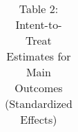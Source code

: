 \begin{longtable}{llcccccccccc}
\caption{Table 2: Intent-to-Treat Estimates for Main Outcomes (Standardized Effects)} \label{tab:all__std1} \\                                                                                                                                                                                                                                                                                                                                                                                                                                                                                                                                                                                                                                                                                                                                                                          
\hline \hline                                                                                                                                                                                                                                                                                                                                                                                                                                                                                                                                                                                                                                                                                                                                                                                                                                                                           

\end{longtable}
